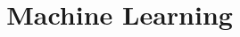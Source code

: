 % 


% 
% 
% 


% 


% 

%
% 


% 


% 


% 

\part{~~Machine Learning}





% 

\printbibliography


